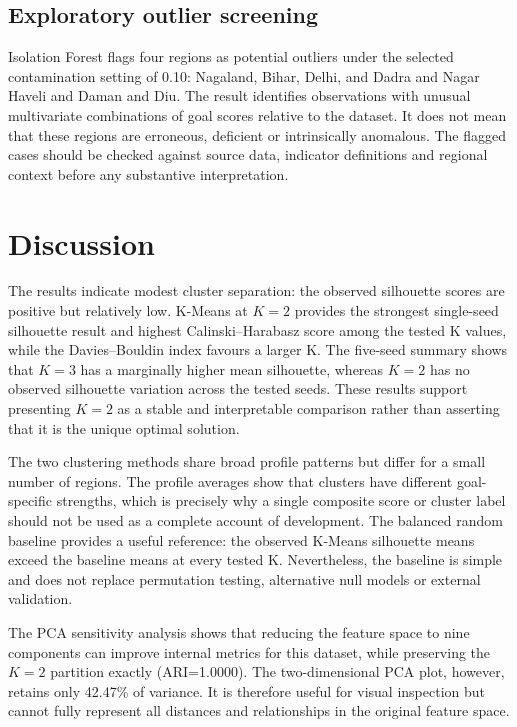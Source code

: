\documentclass[11pt,a4paper]{article}
\begin{document}
\subsection{Exploratory outlier screening}
Isolation Forest flags four regions as potential outliers under the selected contamination setting of 0.10: Nagaland, Bihar, Delhi, and Dadra and Nagar Haveli and Daman and Diu. The result identifies observations with unusual multivariate combinations of goal scores relative to the dataset. It does not mean that these regions are erroneous, deficient or intrinsically anomalous. The flagged cases should be checked against source data, indicator definitions and regional context before any substantive interpretation.

\section{Discussion}
The results indicate modest cluster separation: the observed silhouette scores are positive but relatively low. K-Means at $K=2$ provides the strongest single-seed silhouette result and highest Calinski--Harabasz score among the tested K values, while the Davies--Bouldin index favours a larger K. The five-seed summary shows that $K=3$ has a marginally higher mean silhouette, whereas $K=2$ has no observed silhouette variation across the tested seeds. These results support presenting $K=2$ as a stable and interpretable comparison rather than asserting that it is the unique optimal solution.

The two clustering methods share broad profile patterns but differ for a small number of regions. The profile averages show that clusters have different goal-specific strengths, which is precisely why a single composite score or cluster label should not be used as a complete account of development. The balanced random baseline provides a useful reference: the observed K-Means silhouette means exceed the baseline means at every tested K. Nevertheless, the baseline is simple and does not replace permutation testing, alternative null models or external validation.

The PCA sensitivity analysis shows that reducing the feature space to nine components can improve internal metrics for this dataset, while preserving the $K=2$ partition exactly (ARI=1.0000). The two-dimensional PCA plot, however, retains only 42.47\% of variance. It is therefore useful for visual inspection but cannot fully represent all distances and relationships in the original feature space.
\end{document}

